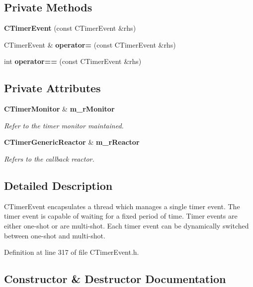 \subsection*{Private Methods}
\begin{CompactItemize}
\item 
{\bf CTimer\-Event} (const CTimer\-Event \&rhs)
\item 
CTimer\-Event \& {\bf operator=} (const CTimer\-Event \&rhs)
\item 
int {\bf operator==} (const CTimer\-Event \&rhs)
\end{CompactItemize}
\subsection*{Private Attributes}
\begin{CompactItemize}
\item 
{\bf CTimer\-Monitor} \& {\bf m\_\-r\-Monitor}
\begin{CompactList}\small\item\em Refer to the timer monitor maintained.\item\end{CompactList}\item 
{\bf CTimer\-Generic\-Reactor} \& {\bf m\_\-r\-Reactor}
\begin{CompactList}\small\item\em Refers to the callback reactor.\item\end{CompactList}\end{CompactItemize}


\subsection{Detailed Description}
CTimer\-Event encapsulates a thread which manages a single timer event. The timer event is capable of waiting for a fixed period of time. Timer events are either one-shot or are multi-shot. Each timer event can be dynamically switched between one-shot and multi-shot. 



Definition at line 317 of file CTimer\-Event.h.

\subsection{Constructor \& Destructor Documentation}
